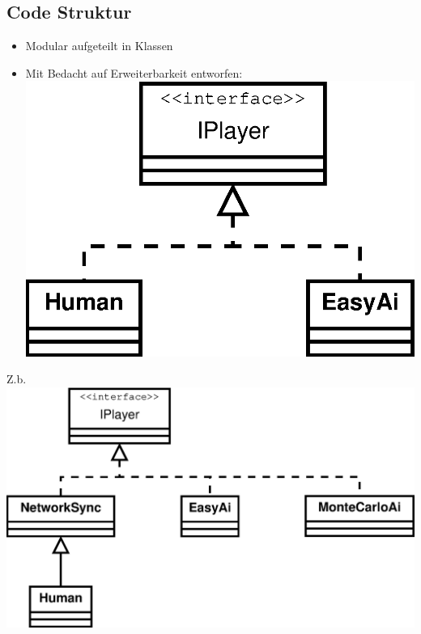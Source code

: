 \documentclass[12pt]{beamer}
\begin{document}
\subsection{Code Struktur}
\begin{frame}
	\begin{itemize}
		\item Modular aufgeteilt in Klassen
		\item Mit Bedacht auf Erweiterbarkeit entworfen:\\ \vspace*{5pt}
			\includegraphics[width=0.5\linewidth]{media/structure1.eps}
	\end{itemize}
\end{frame}
\begin{frame}
	Z.b.\\ \vspace*{5pt}
	\includegraphics[width=0.8\linewidth]{media/structure2.eps}
\end{frame}
\end{document}
